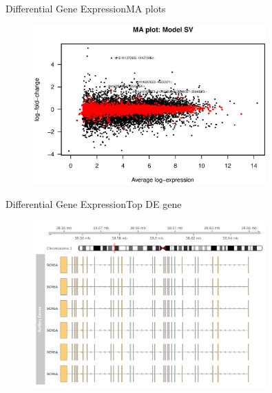 \documentclass{beamer}
\begin{document}
\begin{frame}{Differential Gene Expression}{MA plots}

   \begin{figure}
        \includegraphics[width=0.8\textwidth,height=0.8\textheight,keepaspectratio]{MAplot.eps}
    \end{figure}

\end{frame}


\begin{frame}{Differential Gene Expression}{Top DE gene}

   \begin{figure}
        \includegraphics[width=0.8\textwidth,height=0.8\textheight,keepaspectratio]{SCN5A}
    \end{figure}

\end{frame}
\end{document}
